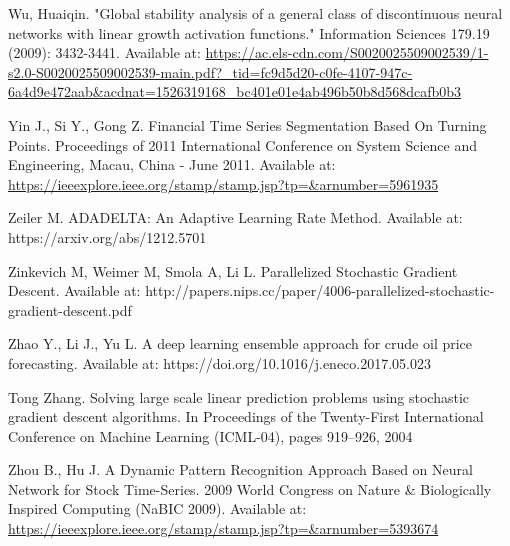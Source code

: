 \documentclass[a4paper,latin]{paper}
\begin{document}
\begin{thebibliography}{9}
Wu, Huaiqin. "Global stability analysis of a general class of discontinuous neural networks with linear growth activation functions." Information Sciences 179.19 (2009): 3432-3441.
Available at: \url{https://ac.els-cdn.com/S0020025509002539/1-s2.0-S0020025509002539-main.pdf?_tid=fc9d5d20-c0fe-4107-947c-6a4d9e472aab&acdnat=1526319168_bc401e01e4ab496b50b8d568dcafb0b3}

Yin J., Si Y., Gong Z. Financial Time Series Segmentation Based On Turning 
Points. Proceedings of 2011 International Conference on System Science and Engineering, Macau, China - June 
2011. Available at: \url{https://ieeexplore.ieee.org/stamp/stamp.jsp?tp=&arnumber=5961935}

Zeiler M. ADADELTA: An Adaptive Learning Rate Method. Available at: https://arxiv.org/abs/1212.5701

Zinkevich M, Weimer M, Smola A, Li L. Parallelized Stochastic Gradient Descent. 
Available at: 
http://papers.nips.cc/paper/4006-parallelized-stochastic-gradient-descent.pdf

Zhao Y., Li J., Yu L. A deep learning ensemble approach for crude oil price 
forecasting.  Available at: https://doi.org/10.1016/j.eneco.2017.05.023

Tong Zhang. Solving large scale linear prediction problems using stochastic gradient descent algorithms. In Proceedings of the Twenty-First International Conference on Machine Learning (ICML-04), pages 919–926, 2004

Zhou B., Hu J. A Dynamic Pattern Recognition Approach Based on Neural Network for Stock Time-Series. 2009 World Congress on Nature \& Biologically Inspired Computing (NaBIC 
2009). Available at:\url{ https://ieeexplore.ieee.org/stamp/stamp.jsp?tp=&arnumber=5393674}

\end{thebibliography}
\end{document}
